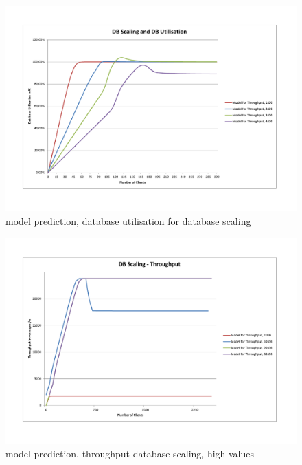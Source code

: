 \documentclass[a4paper]{article}
\begin{document}
\begin{landscape}
\begin{figure}[H]
	\begin{center}
    \includegraphics[scale=0.7, trim = 23mm 28mm 24mm 24mm, clip]{measurements_increase_load/db_utilisation.pdf}
  \end{center}
  \caption{model prediction, database utilisation for database scaling}
  \label{fig:db-utilisation}
\end{figure}

\begin{figure}[H]
	\begin{center}
    \includegraphics[scale=0.7, trim = 23mm 28mm 24mm 24mm, clip]{measurements_increase_load/tp_db_scale2.pdf}
  \end{center}
  \caption{model prediction, throughput database scaling, high values}
  \label{fig:tp-db-scale2}
\end{figure}


\end{landscape}
\end{document}
